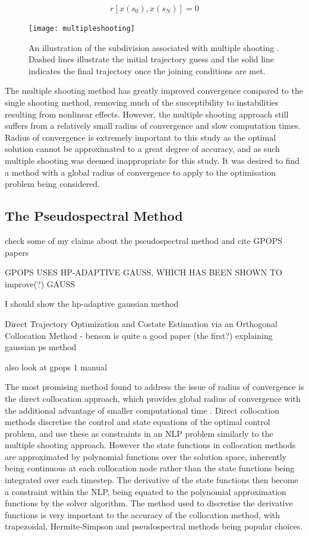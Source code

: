 \begin{equation}
r[x(s_0),x(s_N)] = 0
\end{equation}



\begin{figure}[ht]
	\centering
	\texttt{[image: multipleshooting]}
	\caption{An illustration of the subdivision associated with multiple shooting \cite{Michalik2009}. Dashed lines illustrate the initial trajectory guess and the solid line indicates the final trajectory once the joining conditions are met.}
	\label{fig:multipleshooting}
\end{figure}

The multiple shooting method has greatly improved convergence compared to the single shooting method, removing much of the susceptibility to instabilities resulting from nonlinear effects. However, the multiple shooting approach still suffers from a relatively small radius of convergence and slow computation times. Radius of convergence is extremely important to this study as the optimal solution cannot be approximated to a great degree of accuracy, and as such multiple shooting was deemed inappropriate for this study. It was desired to find a method with a global radius of convergence to apply to the optimisation problem being considered.

\subsection{The Pseudospectral Method}\label{sec:PS}

check some of my claims about the pseudospectral method and cite GPOPS papers

GPOPS USES HP-ADAPTIVE GAUSS, WHICH HAS BEEN SHOWN TO improve(?) GAUSS

I should show the hp-adaptive gaussian method

Direct Trajectory Optimization and
Costate Estimation via an Orthogonal
Collocation Method - benson
is quite a good paper (the first?) explaining gaussian ps method

also look at gpops 1 manual

The most promising method found to address the issue of radius of convergence is the direct collocation approach, which provides global radius of convergence with the additional advantage of smaller computational time \cite{Fasano2013}. Direct collocation methods discretise the control and state equations of the optimal control problem, and use these as constraints in an NLP problem similarly to the multiple shooting approach. However the state functions in collocation methods are approximated by polynomial functions over the solution space, inherently being continuous at each collocation node rather than the state functions being integrated over each timestep. The derivative of the state functions then become a constraint within the NLP, being equated to the polynomial approximation functions by the solver algorithm. The method used to discretise the derivative functions is very important to the accuracy of the collocation method, with trapezoidal, Hermite-Simpson and pseudospectral methods being popular choices.


